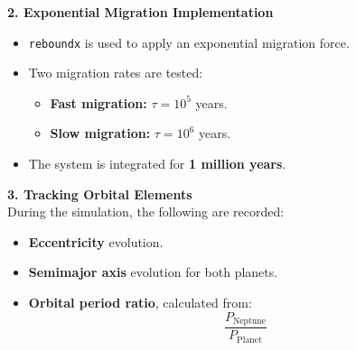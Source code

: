 \documentclass[12pt,a4paper]{article}
\begin{document}
\textbf{2. Exponential Migration Implementation}
\begin{itemize}
    \item \texttt{reboundx} is used to apply an exponential migration force.
    \item Two migration rates are tested:
    \begin{itemize}
        \item \textbf{Fast migration:} \( \tau = 10^5 \) years.
        \item \textbf{Slow migration:} \( \tau = 10^6 \) years.
    \end{itemize}
    \item The system is integrated for \textbf{1 million years}.
\end{itemize}

\textbf{3. Tracking Orbital Elements}
\\ During the simulation, the following are recorded:
\begin{itemize}
    \item \textbf{Eccentricity} evolution.
    \item \textbf{Semimajor axis} evolution for both planets.
    \item \textbf{Orbital period ratio}, calculated from:
    \begin{equation}
        \frac{P_{\text{Neptune}}}{P_{\text{Planet}}}
    \end{equation}
\end{itemize}
\end{document}
